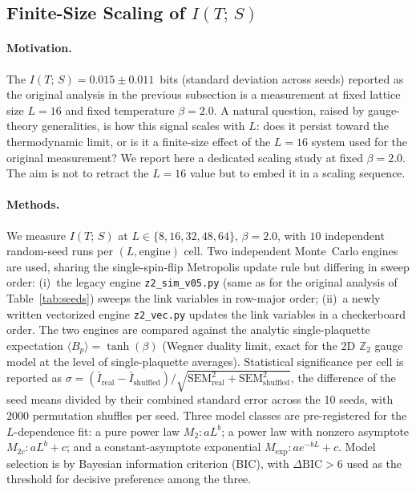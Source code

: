 \documentclass[aps,pra,twocolumn,superscriptaddress,showpacs,floatfix]{revtex4-2}
\newcommand{\Ztwo}{\mathbb{Z}_2}
\newcommand{\MI}{I(T;\,S)}
\begin{document}
\subsection{Finite-Size Scaling of $\MI$}
\label{sec:z2_scaling}

\paragraph{Motivation.}
The $\MI = 0.015 \pm 0.011$~bits (standard deviation across seeds) reported as the original analysis in the previous subsection is a
measurement at fixed lattice size $L=16$ and fixed temperature $\beta=2.0$.
A natural question, raised by gauge-theory generalities, is how this signal
scales with $L$: does it persist toward the thermodynamic limit, or is it a
finite-size effect of the $L=16$ system used for the original measurement? We
report here a dedicated scaling study at fixed $\beta=2.0$. The aim is not to
retract the $L=16$ value but to embed it in a scaling sequence.

\paragraph{Methods.}
We measure $\MI$ at $L \in \{8, 16, 32, 48, 64\}$, $\beta = 2.0$, with $10$
independent random-seed runs per $(L,\text{engine})$ cell. Two independent
Monte~Carlo engines are used, sharing the single-spin-flip Metropolis update
rule but differing in sweep order: (i)~the legacy engine
\texttt{z2\_sim\_v05.py} (same as for the original analysis of Table~\ref{tab:seeds})
sweeps the link variables in row-major order; (ii)~a newly written vectorized
engine \texttt{z2\_vec.py} updates the link variables in a checkerboard order.
The two engines are compared against the analytic single-plaquette expectation
$\langle B_p \rangle = \tanh(\beta)$ (Wegner duality limit, exact for the 2D
$\Ztwo$ gauge model at the level of single-plaquette averages). Statistical significance per cell is reported as $\sigma = (\bar I_\mathrm{real} - \bar I_\mathrm{shuffled}) / \sqrt{\mathrm{SEM}_\mathrm{real}^2 + \mathrm{SEM}_\mathrm{shuffled}^2}$, the difference of the seed means divided by their combined standard error across the 10 seeds, with $2000$ permutation shuffles per seed. Three model classes are
pre-registered for the $L$-dependence fit: a pure power law $M_2 :
a L^{b}$; a power law with nonzero asymptote $M_{2c} : a L^{b} + c$; and a
constant-asymptote exponential $M_\mathrm{exp} : a e^{-b L} + c$. Model selection
is by Bayesian information criterion (BIC), with $\Delta\mathrm{BIC} > 6$ used
as the threshold for decisive preference among the three.
\end{document}
